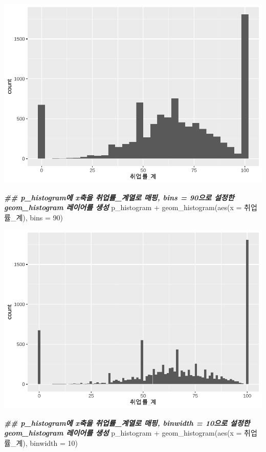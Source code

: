\documentclass[
]{article}
\newenvironment{Shaded}{\begin{snugshade}}{\end{snugshade}}
\newcommand{\AttributeTok}[1]{\textcolor[rgb]{0.77,0.63,0.00}{#1}}
\newcommand{\DecValTok}[1]{\textcolor[rgb]{0.00,0.00,0.81}{#1}}
\newcommand{\DocumentationTok}[1]{\textcolor[rgb]{0.56,0.35,0.01}{\textbf{\textit{#1}}}}
\newcommand{\FunctionTok}[1]{\textcolor[rgb]{0.00,0.00,0.00}{#1}}
\newcommand{\NormalTok}[1]{#1}
\newcommand{\SpecialCharTok}[1]{\textcolor[rgb]{0.00,0.00,0.00}{#1}}
\begin{document}
\includegraphics{chap3_files/figure-latex/unnamed-chunk-20-1.pdf}

\begin{Shaded}
\begin{Highlighting}[]
\DocumentationTok{\#\# p\_histogram에 x축을 \textquotesingle{}취업률\_계\textquotesingle{}열로 매핑, bins = 90으로 설정한 geom\_histogram 레이어를 생성 }
\NormalTok{p\_histogram }\SpecialCharTok{+}
  \FunctionTok{geom\_histogram}\NormalTok{(}\FunctionTok{aes}\NormalTok{(}\AttributeTok{x =}\NormalTok{ 취업률\_계), }\AttributeTok{bins =} \DecValTok{90}\NormalTok{)}
\end{Highlighting}
\end{Shaded}

\includegraphics{chap3_files/figure-latex/unnamed-chunk-20-2.pdf}

\begin{Shaded}
\begin{Highlighting}[]
\DocumentationTok{\#\# p\_histogram에 x축을 \textquotesingle{}취업률\_계\textquotesingle{}열로 매핑, binwidth = 10으로 설정한 geom\_histogram 레이어를 생성 }
\NormalTok{p\_histogram }\SpecialCharTok{+}
  \FunctionTok{geom\_histogram}\NormalTok{(}\FunctionTok{aes}\NormalTok{(}\AttributeTok{x =}\NormalTok{ 취업률\_계), }\AttributeTok{binwidth =} \DecValTok{10}\NormalTok{)}
\end{Highlighting}
\end{Shaded}
\end{document}
